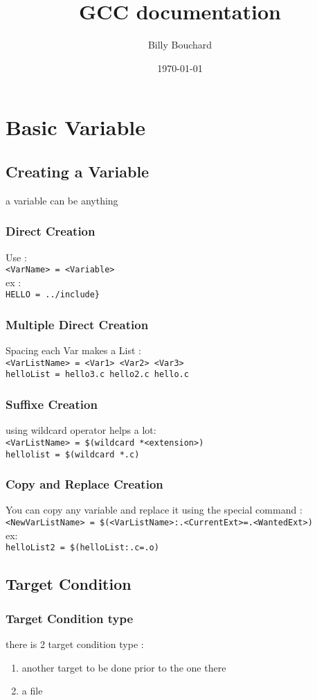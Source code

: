 \documentclass[12pt]{article}
\author{Billy Bouchard}
\title{GCC documentation}
\date{\today}
\begin{document}
\maketitle
\tableofcontents
\newpage
\section{Basic Variable}
\subsection{Creating a Variable}
a variable can be anything
\subsubsection{Direct Creation}
Use : \\
\verb|<VarName> = <Variable>|\\
ex : \\
\verb|HELLO = ../include}|

\subsubsection{Multiple Direct Creation}
Spacing each Var makes a List : \\
\verb|<VarListName> = <Var1> <Var2> <Var3>| \\
\verb|helloList = hello3.c hello2.c hello.c |

\subsubsection{Suffixe Creation}
using wildcard operator helps a lot:\\
\verb|<VarListName> = $(wildcard *<extension>)| \\
\verb|hellolist = $(wildcard *.c)|

\subsubsection{Copy and Replace Creation}
You can copy any variable and replace it using the special command :
\verb|<NewVarListName> = $(<VarListName>:.<CurrentExt>=.<WantedExt>)|\\
ex: \\
\verb|helloList2 = $(helloList:.c=.o)|
\newpage
\subsection{Target Condition}
\subsubsection{Target Condition type}
there is 2 target condition type :
\begin{enumerate}
 \item another target to be done prior to the one there
 \item a file
\end{enumerate}
\end{document}
